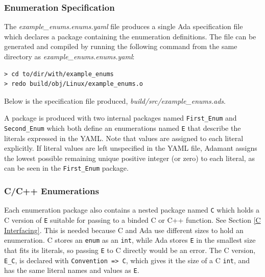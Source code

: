 \subsubsection{Enumeration Specification}

The \textit{example\_enums.enums.yaml} file produces a single Ada specification file which declares a package containing the enumeration definitions. The file can be generated and compiled by running the following command from the same directory as \textit{example\_enums.enums.yaml}:

\vspace{5mm} %
\begin{verbatim}
> cd to/dir/with/example_enums
> redo build/obj/Linux/example_enums.o
\end{verbatim}
\vspace{5mm} %

Below is the specification file produced, \textit{build/src/example\_enums.ads}.


A package is produced with two internal packages named \texttt{First\_Enum} and \texttt{Second\_Enum} which both define an enumerations named \texttt{E} that describe the literals expressed in the YAML. Note that values are assigned to each literal explicitly. If literal values are left unspecified in the YAML file, Adamant assigns the lowest possible remaining unique positive integer (or zero) to each literal, as can be seen in the \texttt{First\_Enum} package.

\subsubsection{C/C++ Enumerations} \label{C Enumerations}

Each enumeration package also contains a nested package named \texttt{C} which holds a C version of \texttt{E} suitable for passing to a binded C or C++ function. See Section \ref{C Interfacing}. This is needed because C and Ada use different sizes to hold an enumeration. C stores an \texttt{enum} as an \texttt{int}, while Ada stores \texttt{E} in the smallest size that fits its literals, so passing \texttt{E} to C directly would be an error. The C version, \texttt{E\_C}, is declared with \texttt{Convention => C}, which gives it the size of a C \texttt{int}, and has the same literal names and values as \texttt{E}. \\


